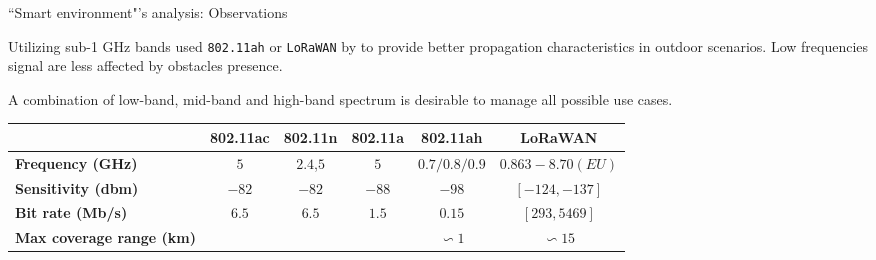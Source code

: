 \documentclass[10pt]{beamer}
\begin{document}
\begin{frame}{``Smart environment"'s analysis: Observations}

\begin{block}{}
\justifying
Utilizing sub-1 GHz bands used \texttt{802.11ah} or \texttt{LoRaWAN} by to provide better propagation characteristics in outdoor scenarios. Low frequencies signal are less affected by obstacles presence.
\end{block}

\begin{block}{}
A combination of low-band, mid-band and high-band spectrum is desirable to manage all possible use cases.
\end{block}

\begin{adjustbox}{width=\columnwidth,center}
\begin{tabular}{l|ccccc}

& \textbf{802.11ac} & \textbf{802.11n} & \textbf{802.11a} & \textbf{802.11ah} & \textbf{LoRaWAN} \\
\hline
\textbf{Frequency (GHz)} & $5$ & $2.4$,$5$ & $5$ & $0.7/0.8/0.9$ & $0.863-8.70 (EU)$ \\
\textbf{Sensitivity (dbm)} & $-82$ & $-82$ & $-88$ & $-98$ &  $[-124,-137]$ \\
\textbf{Bit rate (Mb/s)} & $6.5$ & $6.5$ & $1.5$ & $0.15$ & $[293, 5469]$ \\
\textbf{Max coverage range (km)} &&&& $\backsim 1$ & $\backsim 15$ \\

\end{tabular}
\end{adjustbox}


\end{frame} 
\end{document}
